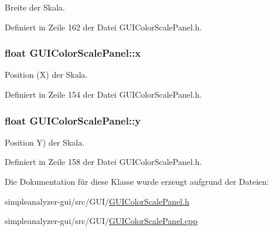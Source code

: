 Breite der Skala. 



Definiert in Zeile 162 der Datei G\-U\-I\-Color\-Scale\-Panel.\-h.

\hypertarget{classGUIColorScalePanel_a41599e2046e6766d5276c95d4aa54ad3}{
\subsubsection[{x}]{\setlength{\rightskip}{0pt plus 5cm}float G\-U\-I\-Color\-Scale\-Panel\-::x\hspace{0.3cm}{\ttfamily [private]}}}\label{classGUIColorScalePanel_a41599e2046e6766d5276c95d4aa54ad3}


Position (X) der Skala. 



Definiert in Zeile 154 der Datei G\-U\-I\-Color\-Scale\-Panel.\-h.

\hypertarget{classGUIColorScalePanel_a5a33f7666c1c49ca8cfe2e4de3dd06e0}{
\subsubsection[{y}]{\setlength{\rightskip}{0pt plus 5cm}float G\-U\-I\-Color\-Scale\-Panel\-::y\hspace{0.3cm}{\ttfamily [private]}}}\label{classGUIColorScalePanel_a5a33f7666c1c49ca8cfe2e4de3dd06e0}


Position Y) der Skala. 



Definiert in Zeile 158 der Datei G\-U\-I\-Color\-Scale\-Panel.\-h.



Die Dokumentation für diese Klasse wurde erzeugt aufgrund der Dateien\-:\begin{DoxyCompactItemize}
\item 
simpleanalyzer-\/gui/src/\-G\-U\-I/\hyperlink{GUIColorScalePanel_8h}{G\-U\-I\-Color\-Scale\-Panel.\-h}\item 
simpleanalyzer-\/gui/src/\-G\-U\-I/\hyperlink{GUIColorScalePanel_8cpp}{G\-U\-I\-Color\-Scale\-Panel.\-cpp}\end{DoxyCompactItemize}
